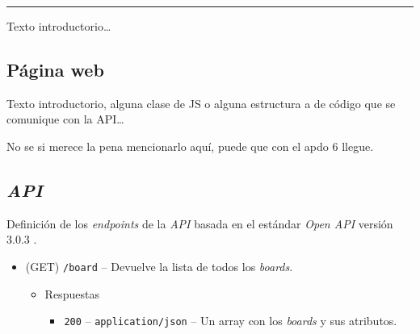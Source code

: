 \documentclass[12pt,a4paper,titlepage]{article}
\begin{document}
    \bigskip\hrule\bigskip

    Texto introductorio\dots

    \subsection{Página web}

    Texto introductorio, alguna clase de JS o alguna estructura a de código que se comunique con la API\dots

    No se si merece la pena mencionarlo aquí, puede que con el apdo 6 llegue.

    \subsection{\textit{API}}

    Definición de los \textit{endpoints} de la \textit{API} basada en el estándar \textit{Open API} versión 3.0.3 \cite{swagger:specification}.

    \begin{itemize}
        \item (GET) \texttt{/board} -- Devuelve la lista de todos los \textit{boards}.
        \begin{itemize}
            \item Respuestas
            \begin{itemize}
                \item \texttt{200} -- \texttt{application/json} -- Un array con los \textit{boards} y sus atributos.
            \end{itemize}
        \end{itemize}
    \end{itemize}

    
\end{document}
